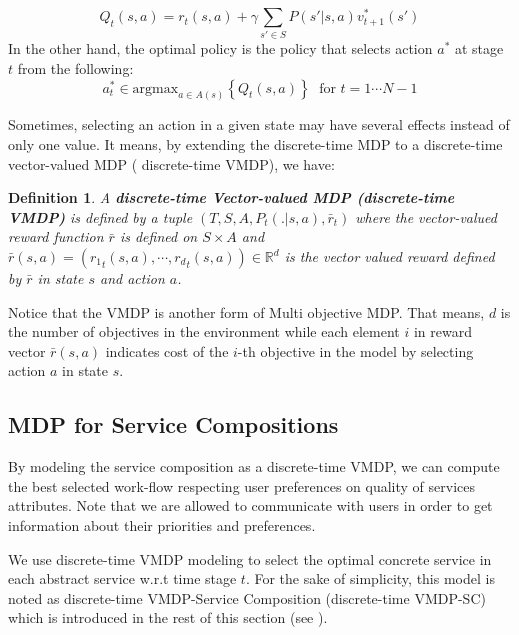 \documentclass[10pt,journal,compsoc]{IEEEtran}
\newtheorem{definition}{Definition}
\begin{document}
\begin{equation}
Q_t(s,a) = r_t(s,a) + \gamma \sum_{s' \in S} P(s'|s,a) v_{t+1}^*(s')
\end{equation}
In the other hand, the optimal policy is the policy that selects action $a^*$ at stage $t$ from the following:
\begin{equation}\label{eq:opt-action}
a^*_t \in \text{argmax}_{a \in A(s)} \left \{ Q_t(s,a) \right \} \; \text{ for } t=1 \cdots N-1
\end{equation}

Sometimes, selecting an action in a given state may have several effects instead of only one value. It means, by extending the discrete-time MDP to a discrete-time vector-valued MDP ( discrete-time VMDP), we have: 

\begin{definition} \cite{alizadeh:hal-01358345}
A \textbf{discrete-time Vector-valued MDP (discrete-time VMDP)} is defined by a tuple $ (T, S, A, P_t(.|s,a), \bar{r}_t)$ where the vector-valued reward function $\bar{r}$ is defined on $S \times A$ and $\bar{r}(s, a) = ({r_1}_t(s,a), \cdots, {r_d}_t(s,a)) \in \mathbb{R}^d$ is the vector valued reward defined by $\bar{r}$ in state $s$ and action $a$. 
\end{definition}

Notice that the VMDP is another form of Multi objective MDP. That means, $d$ is the number of objectives in the environment while each element $i$ in reward vector $\bar{r}(s, a)$ indicates cost of the $i$-th objective in the model by selecting action $a$ in state $s$. 

\subsection{MDP for Service Compositions}

By modeling the service composition as a discrete-time VMDP, we can 
compute the best selected work-flow respecting user preferences on quality of services attributes. Note that we are allowed to communicate with users in order to get information about their priorities and preferences. 

We use discrete-time VMDP modeling to select the optimal concrete service in each abstract service w.r.t time stage $t$. For the sake of simplicity, this model is noted as discrete-time VMDP-Service Composition (discrete-time VMDP-SC) which is introduced in the rest of this section (see \cite{Wang2010,Mostafa2015}). 
\end{document}
